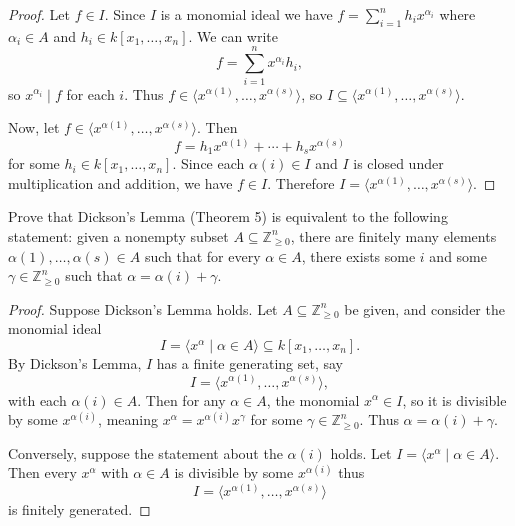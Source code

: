 \begin{proof}
    Let $f \in I$. Since $I$ is a monomial ideal we have 
    $f = \sum_{i = 1}^n h_i x^{\alpha_i}$ where $\alpha_i \in A$ and $h_i \in k[x_1, \ldots, x_n]$.
    We can write 
    \[f = \sum_{i=1}^n x^{\alpha_i} h_i,\]
    so $x^{\alpha_i} \mid f$ for each $i$.
    Thus $f \in \langle x^{\alpha(1)}, \ldots, x^{\alpha(s)} \rangle$,
    so $I \subseteq \langle x^{\alpha(1)}, \ldots, x^{\alpha(s)} \rangle$.
    
    Now, let $f \in \langle x^{\alpha(1)}, \ldots, x^{\alpha(s)} \rangle$.
    Then 
    \[f = h_1 x^{\alpha(1)} + \cdots + h_s x^{\alpha(s)}\]
    for some $h_i \in k[x_1, \ldots, x_n]$.
    Since each $\alpha(i) \in I$ and $I$ is closed under multiplication and addition,
    we have $f \in I$.
    Therefore $I = \langle x^{\alpha(1)}, \ldots, x^{\alpha(s)} \rangle$.
\end{proof}


\begin{tcolorbox}[title=Problem 7, breakable]
    Prove that Dickson's Lemma (Theorem 5) is equivalent to the 
    following statement: given a nonempty subset $A \subseteq \mathbb{Z}_{\ge 0}^n$,
    there are finitely many elements $\alpha(1), \ldots, \alpha(s) \in A$ such 
    that for every $\alpha \in A$, there exists some $i$ and some $\gamma \in \mathbb{Z}_{\ge 0}^n$
    such that $\alpha = \alpha(i) + \gamma$.
\end{tcolorbox}

\begin{proof}
    Suppose Dickson's Lemma holds. Let $A \subseteq \mathbb{Z}_{\ge 0}^n$ be given, 
        and consider the monomial ideal
    \[
        I = \langle x^\alpha \mid \alpha \in A \rangle \subseteq k[x_1, \dots, x_n].
    \]
    By Dickson's Lemma, $I$ has a finite generating set, say
    \[
        I = \langle x^{\alpha(1)}, \dots, x^{\alpha(s)} \rangle,
    \]
    with each $\alpha(i) \in A$. 
    Then for any $\alpha \in A$, the monomial $x^\alpha \in I$,
    so it is divisible by some $x^{\alpha(i)}$, 
        meaning $x^\alpha = x^{\alpha(i)} x^\gamma$ for 
    some $\gamma \in \mathbb{Z}_{\ge 0}^n$. 
    Thus $\alpha = \alpha(i) + \gamma$.

    Conversely, suppose the statement about the $\alpha(i)$ holds. 
    Let $I = \langle x^\alpha \mid \alpha \in A \rangle$.
    Then every $x^\alpha$ with $\alpha \in A$ is divisible by some $x^{\alpha(i)}$ thus 
    \[
        I = \langle x^{\alpha(1)}, \dots, x^{\alpha(s)} \rangle
    \]
    is finitely generated.
\end{proof}

